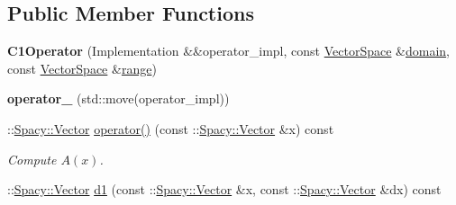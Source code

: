 \subsection*{\-Public \-Member \-Functions}
\begin{DoxyCompactItemize}
\item 
\hypertarget{classSpacy_1_1dealII_1_1C1Operator_a3dab8f73de1d9e486bb9cc1149c01ee4}{{\bfseries \-C1\-Operator} (\-Implementation \&\&operator\-\_\-impl, const \hyperlink{classSpacy_1_1VectorSpace}{\-Vector\-Space} \&\hyperlink{classSpacy_1_1OperatorBase_a2588f9b3e0188820c4c494e63293dc6f}{domain}, const \hyperlink{classSpacy_1_1VectorSpace}{\-Vector\-Space} \&\hyperlink{classSpacy_1_1OperatorBase_ab19d3b7a6f290b1079248f1e567e53d6}{range})}\label{classSpacy_1_1dealII_1_1C1Operator_a3dab8f73de1d9e486bb9cc1149c01ee4}

\item 
\hypertarget{classSpacy_1_1dealII_1_1C1Operator_aeb579eabaaac36f6fdaa5d5aebb23976}{{\bfseries operator\-\_\-} (std\-::move(operator\-\_\-impl))}\label{classSpacy_1_1dealII_1_1C1Operator_aeb579eabaaac36f6fdaa5d5aebb23976}

\item 
\hypertarget{classSpacy_1_1dealII_1_1C1Operator_af10e1a66846a145f7e2fd01460f67843}{\-::\hyperlink{classSpacy_1_1Vector}{\-Spacy\-::\-Vector} \hyperlink{classSpacy_1_1dealII_1_1C1Operator_af10e1a66846a145f7e2fd01460f67843}{operator()} (const \-::\hyperlink{classSpacy_1_1Vector}{\-Spacy\-::\-Vector} \&x) const }\label{classSpacy_1_1dealII_1_1C1Operator_af10e1a66846a145f7e2fd01460f67843}

\begin{DoxyCompactList}\small\item\em \-Compute $A(x)$. \end{DoxyCompactList}\item 
\hypertarget{classSpacy_1_1dealII_1_1C1Operator_a4e97c9f7115f0b4f650d7cf5fb6415ee}{\-::\hyperlink{classSpacy_1_1Vector}{\-Spacy\-::\-Vector} \hyperlink{classSpacy_1_1dealII_1_1C1Operator_a4e97c9f7115f0b4f650d7cf5fb6415ee}{d1} (const \-::\hyperlink{classSpacy_1_1Vector}{\-Spacy\-::\-Vector} \&x, const \-::\hyperlink{classSpacy_1_1Vector}{\-Spacy\-::\-Vector} \&dx) const }\label{classSpacy_1_1dealII_1_1C1Operator_a4e97c9f7115f0b4f650d7cf5fb6415ee}


\end{DoxyCompactItemize}
